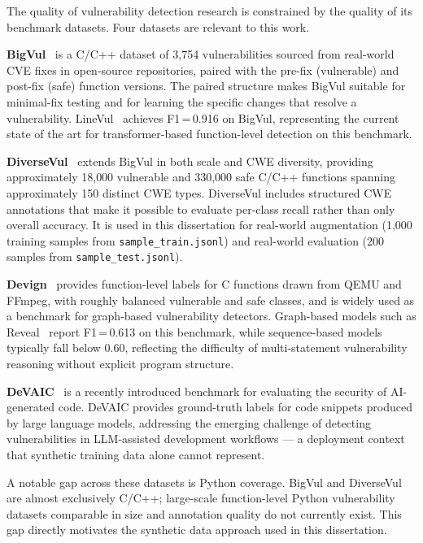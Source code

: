 The quality of vulnerability detection research is constrained by the quality of its
benchmark datasets.
Four datasets are relevant to this work.

\textbf{BigVul}~\cite{fan2020bigvul} is a C/C++ dataset of 3{,}754 vulnerabilities
sourced from real-world CVE fixes in open-source repositories, paired with the pre-fix
(vulnerable) and post-fix (safe) function versions.
The paired structure makes BigVul suitable for minimal-fix testing and for learning the
specific changes that resolve a vulnerability.
LineVul~\cite{fu2022linevul} achieves F1\,=\,0.916 on BigVul, representing the
current state of the art for transformer-based function-level detection on this benchmark.

\textbf{DiverseVul}~\cite{ni2023diversevul,chen2023diversevul} extends BigVul in both
scale and CWE diversity, providing approximately 18{,}000 vulnerable and 330{,}000 safe
C/C++ functions spanning approximately 150 distinct CWE types.
DiverseVul includes structured CWE annotations that make it possible to evaluate
per-class recall rather than only overall accuracy.
It is used in this dissertation for real-world augmentation (1{,}000 training samples
from \texttt{sample\_train.jsonl}) and real-world evaluation (200 samples from
\texttt{sample\_test.jsonl}).

\textbf{Devign}~\cite{zhou2019devign} provides function-level labels for C functions
drawn from QEMU and FFmpeg, with roughly balanced vulnerable and safe classes, and is
widely used as a benchmark for graph-based vulnerability detectors.
Graph-based models such as Reveal~\cite{chakraborty2022reveal} report F1\,=\,0.613 on
this benchmark, while sequence-based models typically fall below 0.60, reflecting the
difficulty of multi-statement vulnerability reasoning without explicit program structure.

\textbf{DeVAIC}~\cite{cotroneo2025devaic} is a recently introduced benchmark for
evaluating the security of AI-generated code.
DeVAIC provides ground-truth labels for code snippets produced by large language models,
addressing the emerging challenge of detecting vulnerabilities in LLM-assisted development
workflows --- a deployment context that synthetic training data alone cannot represent.

A notable gap across these datasets is Python coverage.
BigVul and DiverseVul are almost exclusively C/C++; large-scale function-level Python
vulnerability datasets comparable in size and annotation quality do not currently exist.
This gap directly motivates the synthetic data approach used in this dissertation.

